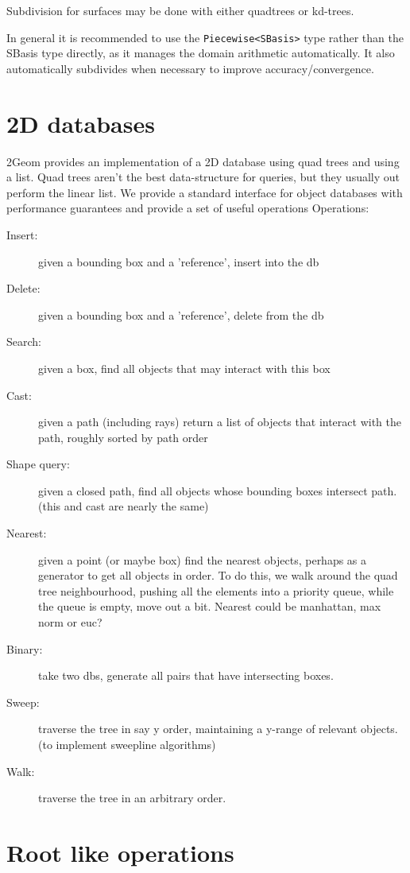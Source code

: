 \documentclass[openany]{book}
\begin{document}
Subdivision for surfaces may be done with either quadtrees or kd-trees.

In general it is recommended to use the \verb|Piecewise<SBasis>| type rather than the SBasis type directly, as it manages the domain arithmetic automatically.  It also automatically subdivides when necessary to improve accuracy/convergence.

\chapter{2D databases}

2Geom provides an implementation of a 2D database using quad trees and
using a list.  Quad trees aren't the best data-structure for queries,
but they usually out perform the linear list.  We provide a
standard interface for object databases with performance guarantees
and provide a set of useful operations Operations:

\begin{description}
\item[Insert:] given a bounding box and a 'reference', insert into the db
\item[Delete:] given a bounding box and a 'reference', delete from the db
\item[Search:] given a box, find all objects that may interact with this box
\item[Cast:] given a path (including rays) return a list of objects that interact with the path, roughly sorted by path order
\item[Shape query:] given a closed path, find all objects whose bounding boxes intersect path.  (this and cast are nearly the same)
\item[Nearest:] given a point (or maybe box) find the nearest objects, perhaps as a generator to get all objects in order.  To do this, we walk around the quad tree neighbourhood, pushing all the elements into a priority queue, while the queue is empty, move out a bit.  Nearest could be manhattan, max norm or euc?
\item[Binary:] take two dbs, generate all pairs that have intersecting boxes.
\item[Sweep:] traverse the tree in say y order, maintaining a y-range of relevant objects. (to implement sweepline algorithms)
\item[Walk:] traverse the tree in an arbitrary order.
\end{description}

\chapter{Root like operations}
\end{document}

